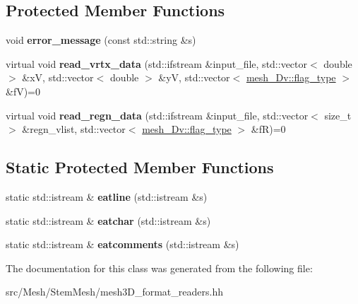 \subsection*{Protected Member Functions}
\begin{DoxyCompactItemize}
\item 
\mbox{\label{classStemMesh3D_1_1mesh2D__reader_a178adde6c4b6e4e8d71de5b4891219cc}} 
void {\bfseries error\+\_\+message} (const std\+::string \&s)
\item 
\mbox{\label{classStemMesh3D_1_1mesh2D__reader_acaaa656a532855ab4ef7b4a1887ca151}} 
virtual void {\bfseries read\+\_\+vrtx\+\_\+data} (std\+::ifstream \&input\+\_\+file, std\+::vector$<$ double $>$ \&xV, std\+::vector$<$ double $>$ \&yV, std\+::vector$<$ \hyperlink{classStemMesh3D_1_1mesh__3Dv_a9544cba555b60f17f04fcd1689314338}{mesh\+\_\+Dv\+::flag\+\_\+type} $>$ \&fV)=0
\item 
\mbox{\label{classStemMesh3D_1_1mesh2D__reader_aa817255612a6468a4843a26b27561d0f}} 
virtual void {\bfseries read\+\_\+regn\+\_\+data} (std\+::ifstream \&input\+\_\+file, std\+::vector$<$ size\+\_\+t $>$ \&regn\+\_\+vlist, std\+::vector$<$ \hyperlink{classStemMesh3D_1_1mesh__3Dv_a9544cba555b60f17f04fcd1689314338}{mesh\+\_\+Dv\+::flag\+\_\+type} $>$ \&fR)=0
\end{DoxyCompactItemize}
\subsection*{Static Protected Member Functions}
\begin{DoxyCompactItemize}
\item 
\mbox{\label{classStemMesh3D_1_1mesh2D__reader_aedd5f683a45a7c28037b4cccae74211c}} 
static std\+::istream \& {\bfseries eatline} (std\+::istream \&s)
\item 
\mbox{\label{classStemMesh3D_1_1mesh2D__reader_a8b241ba77a1527e82990b9729f2edb8b}} 
static std\+::istream \& {\bfseries eatchar} (std\+::istream \&s)
\item 
\mbox{\label{classStemMesh3D_1_1mesh2D__reader_aa546960ba60fa6b70f577ce5a879b752}} 
static std\+::istream \& {\bfseries eatcomments} (std\+::istream \&s)
\end{DoxyCompactItemize}


The documentation for this class was generated from the following file\+:\begin{DoxyCompactItemize}
\item 
src/\+Mesh/\+Stem\+Mesh/mesh3\+D\+\_\+format\+\_\+readers.\+hh\end{DoxyCompactItemize}
